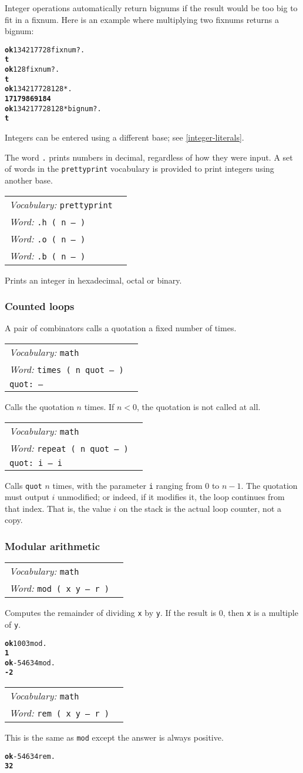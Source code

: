 \documentclass{book}
\newcommand{\vocabulary}[1]{\emph{Vocabulary:} \texttt{#1}&\\}
\newcommand{\ordinaryword}[2]{\index{\texttt{#1}}\emph{Word:} \texttt{#2}&\\}
\newcommand{\wordtable}[1]{


\begin{tabularx}{12cm}{lX}
\hline
#1
\hline
\end{tabularx}

}
\begin{document}
Integer operations automatically return bignums if the result would be too big to fit in a fixnum. Here is an example where multiplying two fixnums returns a bignum:

\begin{alltt}
\textbf{ok} 134217728 fixnum? .
\textbf{t}
\textbf{ok} 128 fixnum? .
\textbf{t}
\textbf{ok} 134217728 128 * .
\textbf{17179869184}
\textbf{ok} 134217728 128 * bignum? .
\textbf{t}
\end{alltt}

Integers can be entered using a different base; see \ref{integer-literals}.

The word \texttt{.} prints numbers in decimal, regardless of how they were input. A set of words in the \texttt{prettyprint} vocabulary is provided to print integers using another base.

\wordtable{
\vocabulary{prettyprint}
\ordinaryword{.h}{.h ( n -- )}
\ordinaryword{.o}{.o ( n -- )}
\ordinaryword{.b}{.b ( n -- )}

}
Prints an integer in hexadecimal, octal or binary.

\subsubsection{Counted loops}

A pair of combinators calls a quotation a fixed number of times.

\wordtable{
\vocabulary{math}
\ordinaryword{times}{times ( n quot -- )}
\texttt{quot:~-- }\\
}
Calls the quotation $n$ times. If $n<0$, the quotation is not called at all.

\wordtable{
\vocabulary{math}
\ordinaryword{repeat}{repeat ( n quot -- )}
\texttt{quot:~i -- i }\\
}
Calls \texttt{quot} $n$ times, with the parameter \texttt{i} ranging from 0 to $n-1$. The quotation must output $i$ unmodified; or indeed, if it modifies it, the loop continues from that index. That is, the value $i$ on the stack is the actual loop counter, not a copy.

\subsubsection{Modular arithmetic}

\wordtable{
\vocabulary{math}
\ordinaryword{mod}{mod ( x y -- r )}
}
Computes the remainder of dividing \texttt{x} by \texttt{y}. If the result is 0, then \texttt{x} is a multiple of \texttt{y}.
\begin{alltt}
\textbf{ok} 100 3 mod .
\textbf{1}
\textbf{ok} -546 34 mod .
\textbf{-2}
\end{alltt}
\wordtable{
\vocabulary{math}
\ordinaryword{rem}{rem ( x y -- r )}
}
This is the same as \texttt{mod} except the answer is always positive.
\begin{alltt}
\textbf{ok} -546 34 rem .
\textbf{32}
\end{alltt}
\end{document}
